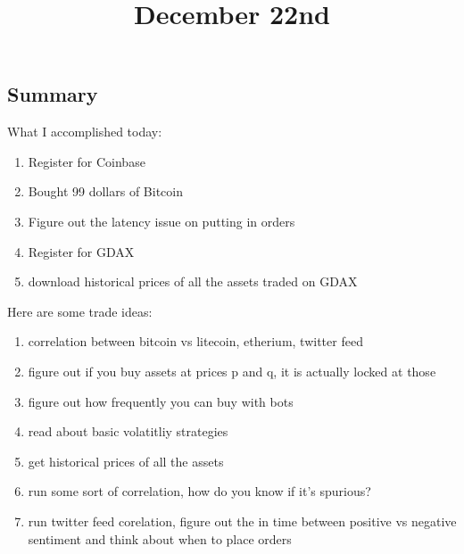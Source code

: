 \title{December 22nd}

\subsection{Summary}

What I accomplished today:

\begin{enumerate}
	\item Register for Coinbase
	\item Bought 99 dollars of Bitcoin
	\item Figure out the latency issue on putting in orders
	\item Register for GDAX
	\item download historical prices of all the assets traded on GDAX
\end{enumerate}

Here are some trade ideas:

\begin{enumerate}
	\item correlation between bitcoin vs {litecoin, etherium, twitter feed}
	\item figure out if you buy assets at prices p and q, it is actually locked at those 
	\item figure out how frequently you can buy with bots
	\item read about basic volatitliy strategies
	\item get historical prices of all the assets
	\item run some sort of correlation, how do you know if it's spurious?
	\item run twitter feed corelation, figure out the in time between positive vs negative
	  sentiment and think about when to place orders
\end{enumerate}
